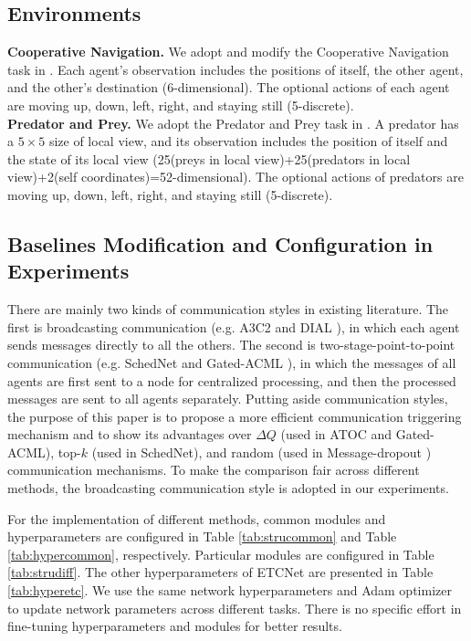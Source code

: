 \documentclass[letterpaper]{article} %
\begin{document}
\subsection*{Environments}\label{sec:Environments}
\textbf{Cooperative Navigation.}  We adopt and modify the Cooperative Navigation task in  \cite{a3c2}. Each agent's observation includes the positions of itself, the other agent, and the other's destination (6-dimensional). The optional actions of each agent are moving up, down, left, right, and staying still (5-discrete).\\
\textbf{Predator and Prey.}  We adopt the Predator and Prey task in  \cite{a3c2}. A predator has a $5 \times 5$ size of local view, and its observation includes the position of itself and the state of its local view (25(preys in local view)+25(predators in local view)+2(self coordinates)=52-dimensional). The optional actions of predators are moving up, down, left, right, and staying still (5-discrete).

\subsection*{Baselines Modification and Configuration in Experiments}\label{sec:Configuration}
There are mainly two kinds of communication styles in existing literature. The first is broadcasting communication (e.g. A3C2 \cite{a3c2} and DIAL \cite{dial} ), in which each agent sends messages directly to all the others. The second is two-stage-point-to-point communication (e.g. SchedNet \cite{schednet} and Gated-ACML \cite{pruning}), in which the messages of all agents are first sent to a node for centralized processing, and then the processed messages are sent to all agents separately. Putting aside communication styles, the purpose of this paper is to propose a more efficient communication triggering mechanism and to show its advantages over  $\Delta Q$ (used in ATOC \cite{atoc} and Gated-ACML), top-$k$ (used in SchedNet), and random (used in Message-dropout \cite{messagedropout}) communication mechanisms. To make the comparison fair across different methods, the broadcasting communication style is adopted in our experiments.

For the implementation of different methods, common modules and hyperparameters are configured in Table \ref{tab:strucommon} and Table \ref{tab:hypercommon}, respectively. Particular modules are configured in Table \ref{tab:strudiff}. The other hyperparameters of ETCNet are presented in Table \ref{tab:hyperetc}.
We use the same network hyperparameters and Adam optimizer to update network parameters across different tasks.
There is no specific effort in fine-tuning hyperparameters and modules for better results.
\end{document}
